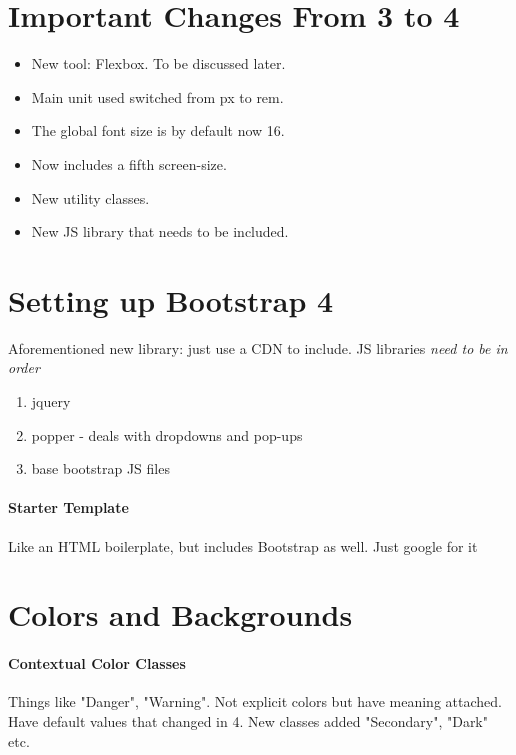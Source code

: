 \documentclass{article}
\begin{document}
	
	\title{}
	\author{Nico Limacher}
	
\maketitle

\section{Important Changes From 3 to 4}

	\begin{itemize}
		\item New tool: Flexbox. To be discussed later.
		\item Main unit used switched from px to rem.
		\item The global font size is by default now 16.
		\item Now includes a fifth screen-size.
		\item New utility classes.
		\item New JS library that needs to be included.
	\end{itemize}

\section{Setting up Bootstrap 4}

	Aforementioned new library: just use a CDN to include. JS libraries \emph{need to be in order}
	
	\begin{enumerate}
		\item jquery
		\item popper - deals with dropdowns and pop-ups
		\item base bootstrap JS files
	\end{enumerate}
	
	\paragraph*{Starter Template} Like an HTML boilerplate, but includes Bootstrap as well. Just google for it

\section{Colors and Backgrounds}

	\paragraph*{Contextual Color Classes} Things like "Danger", "Warning". Not explicit colors but have meaning attached. Have default values that changed in 4. New classes added "Secondary", "Dark" etc.
	
\end{document}
